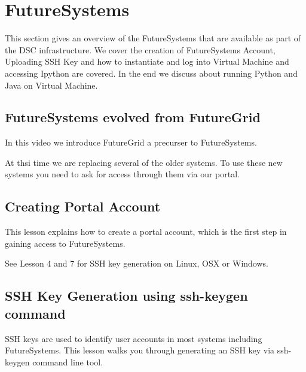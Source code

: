 
\chapter{FutureSystems}
\label{C:futuresystems}

\FILENAME

This section gives an overview of the FutureSystems that are available
as part of the DSC infrastructure. We cover the creation of
FutureSystems Account, Uploading SSH Key and how to instantiate and
log into Virtual Machine and accessing Ipython are covered. In the end
we discuss about running Python and Java on Virtual Machine.

\section{FutureSystems evolved from FutureGrid}

In this video we introduce FutureGrid a precurser to FutureSystems.


At thsi time we are replacing several of the older systems. To use
these new systems you need to ask for access through them via our portal.


\section{Creating Portal Account}

This lesson explains how to create a portal account, which is the first
step in gaining access to FutureSystems.

See Lesson 4 and 7 for SSH key generation on Linux, OSX or Windows.


\section{SSH Key Generation using ssh-keygen command}
\label{ssh-key-generation-using-ssh-keygen-command}

SSH keys are used to identify user accounts in most systems including
FutureSystems. This lesson walks you through generating an SSH key via
ssh-keygen command line tool.


